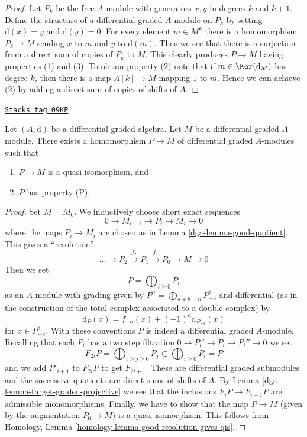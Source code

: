 \begin{proof}
Let $P_k$ be the free $A$-module with generators $x, y$ in degrees
$k$ and $k + 1$. Define the structure of a differential graded
$A$-module on $P_k$ by setting $\text{d}(x) = y$ and $\text{d}(y) = 0$.
For every element $m \in M^k$ there is a homomorphism
$P_k \to M$ sending $x$ to $m$ and $y$ to $\text{d}(m)$.
Thus we see that there is a surjection from a direct sum
of copies of $P_k$ to $M$. This clearly produces $P \to M$
having properties (1) and (3). To obtain property (2) note
that if $m \in \Ker(\text{d}_M)$ has degree $k$, then there is a map
$A[k] \to M$ mapping $1$ to $m$. Hence we can achieve (2) by adding
a direct sum of copies of shifts of $A$.
\end{proof}

\begin{lemma}[Resolve]
\label{dga-lemma-resolve}
\href{https://stacks.math.columbia.edu/tag/09KP}{\texttt{Stacks tag 09KP}}

Let $(A, \text{d})$ be a differential graded algebra.
Let $M$ be a differential graded $A$-module. There exists a homomorphism
$P \to M$ of differential graded $A$-modules such that
\begin{enumerate}
\item $P \to M$ is a quasi-isomorphism, and
\item $P$ has property (P).
\end{enumerate}
\end{lemma}

\begin{proof}

Set $M = M_0$. We inductively choose short exact sequences
$$
0 \to M_{i + 1} \to P_i \to M_i \to 0
$$
where the maps $P_i \to M_i$ are chosen as in Lemma \ref{dga-lemma-good-quotient}.
This gives a ``resolution''
$$
\ldots \to P_2 \xrightarrow{f_2} P_1 \xrightarrow{f_1} P_0 \to M \to 0
$$
Then we set
$$
P = \bigoplus\nolimits_{i \geq 0} P_i
$$
as an $A$-module with grading given by
$P^n = \bigoplus_{a + b = n} P_{-a}^b$ and
differential (as in the construction of the total complex associated
to a double complex) by
$$
\text{d}_P(x) = f_{-a}(x) + (-1)^a \text{d}_{P_{-a}}(x)
$$
for $x \in P_{-a}^b$. With these conventions $P$ is indeed a differential
graded $A$-module. Recalling that each $P_i$ has a two step filtration
$0 \to P_i' \to P_i \to P_i'' \to 0$ we set
$$
F_{2i}P = \bigoplus\nolimits_{i \geq j \geq 0} P_j
\subset
\bigoplus\nolimits_{i \geq 0} P_i = P
$$
and we add $P'_{i + 1}$ to $F_{2i}P$ to get $F_{2i + 1}$.
These are differential graded submodules and the successive quotients
are direct sums of shifts of $A$. By
Lemma \ref{dga-lemma-target-graded-projective} we see that
the inclusions $F_iP \to F_{i + 1}P$ are admissible monomorphisms.
Finally, we have to show that the map $P \to M$ (given by the
augmentation $P_0 \to M$) is a quasi-isomorphism. This follows from
Homology, Lemma \ref{homology-lemma-good-resolution-gives-qis}.
\end{proof}


